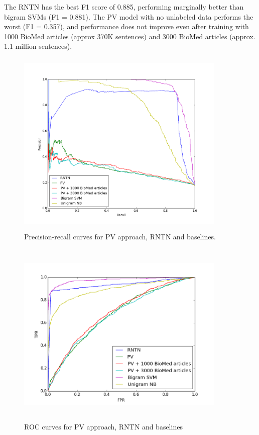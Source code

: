 \documentclass{article}
\begin{document}
The RNTN has the best F1 score of 0.885, performing marginally better than bigram SVMs (F1 = 0.881). The PV model with no unlabeled data performs the worst (F1 = 0.357), and performance does not improve even after training with 1000 BioMed articles (approx 370K sentences) and 3000 BioMed articles (approx. 1.1 million sentences).


\begin{figure}
\centering
\includegraphics[width=10cm,height=9cm,keepaspectratio]{PR_all.png}
\caption{Precision-recall curves for PV approach, RNTN and baselines.}
\label{fig:PR}
\end{figure}
\begin{figure}
\centering   \includegraphics[width=10cm,height=9cm,keepaspectratio]{roc_all.png}
\caption{ROC curves for PV approach, RNTN and baselines}
\label{fig:ROC}
\end{figure}
 
\end{document}
